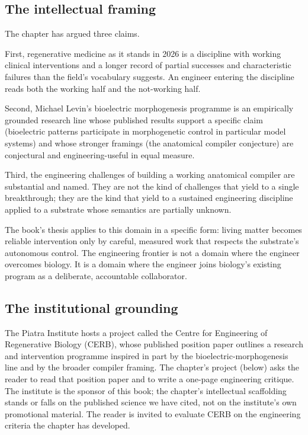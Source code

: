 \subsection{The intellectual framing}

The chapter has argued three claims.

First, regenerative medicine as it stands in 2026 is a discipline with
working clinical interventions and a longer record of partial
successes and characteristic failures than the field's vocabulary
suggests. An engineer entering the discipline reads both the working
half and the not-working half.

Second, Michael Levin's bioelectric morphogenesis programme is an
empirically grounded research line whose published results support a
specific claim (bioelectric patterns participate in morphogenetic
control in particular model systems) and whose stronger framings (the
anatomical compiler conjecture) are conjectural and engineering-useful
in equal measure.

Third, the engineering challenges of building a working anatomical
compiler are substantial and named. They are not the kind of
challenges that yield to a single breakthrough; they are the kind that
yield to a sustained engineering discipline applied to a substrate
whose semantics are partially unknown.

The book's thesis applies to this domain in a specific form: living
matter becomes reliable intervention only by careful, measured work
that respects the substrate's autonomous control. The engineering
frontier is not a domain where the engineer overcomes biology. It is a
domain where the engineer joins biology's existing program as a
deliberate, accountable collaborator.

\subsection{The institutional grounding}

The Piatra Institute hosts a project called the Centre for Engineering
of Regenerative Biology (CERB), whose published position paper outlines
a research and intervention programme inspired in part by the
bioelectric-morphogenesis line and by the broader compiler framing.
The chapter's project (below) asks the reader to read that position
paper and to write a one-page engineering critique. The institute is
the sponsor of this book; the chapter's intellectual scaffolding
stands or falls on the published science we have cited, not on the
institute's own promotional material. The reader is invited to
evaluate CERB on the engineering criteria the chapter has developed.

